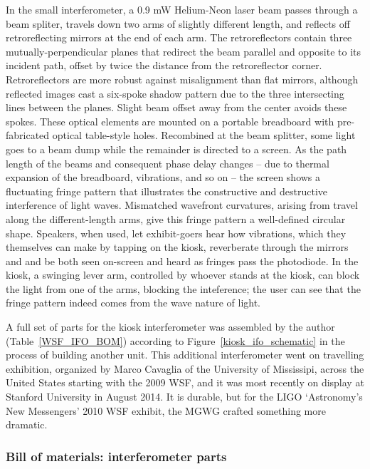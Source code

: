 In the small interferometer, a 0.9 mW Helium-Neon laser beam passes through a beam spliter, travels down two arms of slightly different length, and reflects off retroreflecting mirrors at the end of each arm.
The retroreflectors contain three mutually-perpendicular planes that redirect the beam parallel and opposite to its incident path, offset by twice the distance from the retroreflector corner.
Retroreflectors are more robust against misalignment than flat mirrors, although reflected images cast a six-spoke shadow pattern due to the three intersecting lines between the planes.
Slight beam offset away from the center avoids these spokes.
These optical elements are mounted on a portable breadboard with pre-fabricated optical table-style holes.
Recombined at the beam splitter, some light goes to a beam dump while the remainder is directed to a screen.
As the path length of the beams and consequent phase delay changes -- due to thermal expansion of the breadboard, vibrations, and so on -- the screen shows a fluctuating fringe pattern that illustrates the constructive and destructive interference of light waves.
Mismatched wavefront curvatures, arising from travel along the different-length arms, give this fringe pattern a well-defined circular shape.
Speakers, when used, let exhibit-goers hear how vibrations, which they themselves can make by tapping on the kiosk, reverberate through the mirrors and and be both seen on-screen and heard as fringes pass the photodiode. 
In the kiosk, a swinging lever arm, controlled by whoever stands at the kiosk, can block the light from one of the arms, blocking the inteference; the user can see that the fringe pattern indeed comes from the wave nature of light.

A full set of parts for the kiosk interferometer was assembled by the author (Table~\ref{WSF_IFO_BOM}) according to Figure~\ref{kiosk_ifo_schematic} in the process of building another unit.
This additional interferometer went on travelling exhibition, organized by Marco Cavaglia of the University of Mississipi, across the United States starting with the 2009 WSF, and it was most recently on display at Stanford University in August 2014.
It is durable, but for the LIGO `Astronomy's New Messengers' 2010 WSF exhibit, the MGWG crafted something more dramatic.

    \subsubsection{Bill of materials: interferometer parts}

